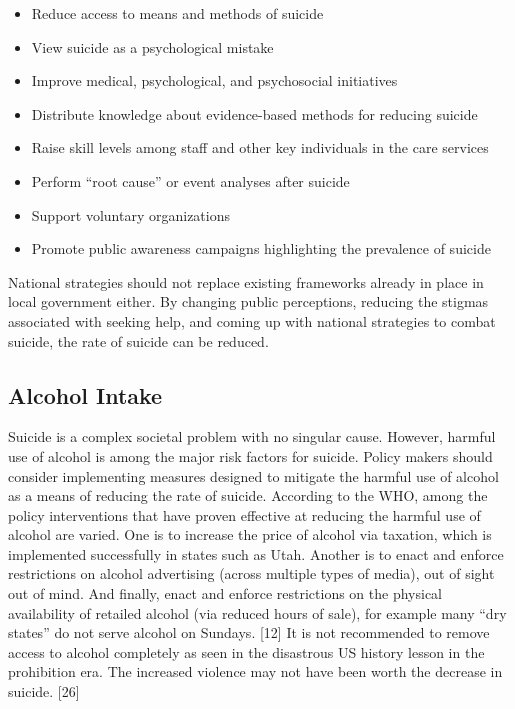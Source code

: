 \documentclass[]{article}
\begin{document}
\begin{itemize}
  \item Reduce access to means and methods of suicide 
  \item View suicide as a psychological mistake
  \item Improve medical, psychological, and psychosocial initiatives
  \item Distribute knowledge about evidence-based methods for reducing suicide
  \item Raise skill levels among staff and other key individuals in the care services
  \item Perform “root cause” or event analyses after suicide
  \item Support voluntary organizations 
  \item Promote public awareness campaigns highlighting the prevalence of suicide
\end{itemize}

National strategies should not replace existing frameworks already in
place in local government either. By changing public perceptions,
reducing the stigmas associated with seeking help, and coming up with
national strategies to combat suicide, the rate of suicide can be
reduced.

\subsection{Alcohol Intake}\label{alcohol-intake}

Suicide is a complex societal problem with no singular cause. However,
harmful use of alcohol is among the major risk factors for suicide.
Policy makers should consider implementing measures designed to mitigate
the harmful use of alcohol as a means of reducing the rate of suicide.
According to the WHO, among the policy interventions that have proven
effective at reducing the harmful use of alcohol are varied. One is to
increase the price of alcohol via taxation, which is implemented
successfully in states such as Utah. Another is to enact and enforce
restrictions on alcohol advertising (across multiple types of media),
out of sight out of mind. And finally, enact and enforce restrictions on
the physical availability of retailed alcohol (via reduced hours of
sale), for example many ``dry states'' do not serve alcohol on Sundays.
{[}12{]} It is not recommended to remove access to alcohol completely as
seen in the disastrous US history lesson in the prohibition era. The
increased violence may not have been worth the decrease in suicide.
{[}26{]}
\end{document}
